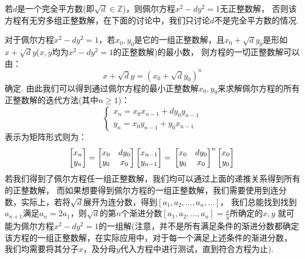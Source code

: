 \documentclass{book}
\numberwithin{equation}{subsubsection}
\begin{document}
若$d$是一个完全平方数(即$\sqrt{d}\in\mathbb{Z}$)，则佩尔方程$x^2-dy^2=1$无正整数解，
否则该方程有无穷多组正整数解，在下面的讨论中，我们只讨论$d$不是完全平方数的情况.\par
对于佩尔方程$x^2-dy^2=1$，若$x_0,y_0$是它的一组正整数解，且$x_0+\sqrt{d}y_0$是形如$x+\sqrt{d}y$($x,y$均为$x^2-dy^2=1$的正整数解)的最小数，
则方程的一切正整数解可以由：
\begin{equation}
    x+\sqrt{d}y=(x_0+\sqrt{d}y_0)^n
    \nonumber
\end{equation}
确定.
由此我们可以得到通过佩尔方程的最小正整数解$x_0,y_0$来求解佩尔方程的所有正整数解的迭代方法(其中$n\ge1$)：
\begin{equation}
    \begin{cases}
        x_{n}=x_0x_{n-1}+dy_0y_{n-1}\\
        y_{n}=x_0y_{n-1}+y_0x_{n-1}
    \end{cases}
    \nonumber
\end{equation}
表示为矩阵形式则为：
\begin{equation}
    \begin{bmatrix}
        x_n\\
        y_n
    \end{bmatrix}=
    \begin{bmatrix}
        x_0&dy_0\\
        y_0&x_0
    \end{bmatrix}
    \begin{bmatrix}
        x_{n-1}\\
        y_{n-1}
    \end{bmatrix}=\\
    \begin{bmatrix}
        x_0&dy_0\\
        y_0&x_0
    \end{bmatrix}^n
    \begin{bmatrix}
        x_{0}\\
        y_{0}
    \end{bmatrix}\\
    \nonumber
\end{equation}
若我们得到了佩尔方程任一组正整数解，我们均可以通过上面的递推关系得到所有的正整数解，
而如果想要得到佩尔方程的一组正整数解，我们需要使用到连分数，实际上，若将$\sqrt{d}$展开为连分数，得到$[a_1,a_2,\ldots,a_n,\ldots]$，
我们总能找到找到$a_{n+1}$满足$a_n=2a_1$，则$\sqrt{d}$的第$n$个渐进分数$[a_1,a_2,\ldots,a_{n}]=\frac{x}{y}$所确定的$x,y$
就可能为佩尔方程$x^2-dy^2=1$的一组解(注意，并不是所有满足条件的渐进分数都确定该方程的一组正整数解，在实际应用中，对于每一个满足上述条件的渐进分数，
我们均需要将其分子$x$，及分母$y$代入方程中进行测试，直到符合方程为止).
\end{document}
